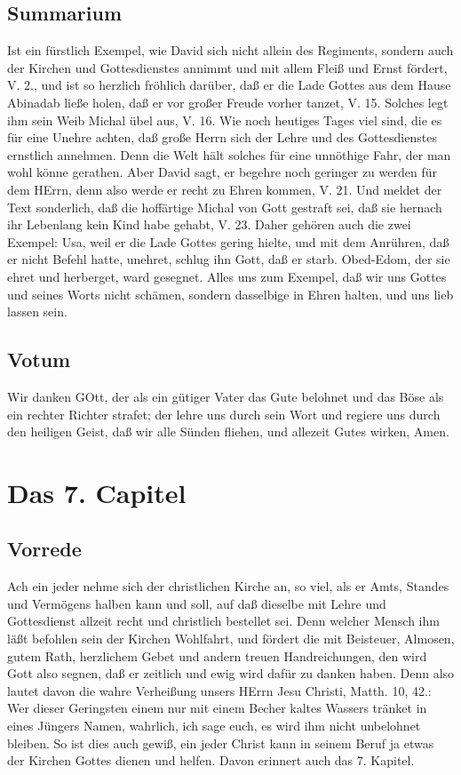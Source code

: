 \section{Summarium}

Ist ein fürstlich Exempel, wie David sich nicht allein des Regiments, sondern auch der Kirchen und Gottesdienstes annimmt und mit allem Fleiß und Ernst fördert, V. 2., und ist so herzlich fröhlich darüber, daß er die Lade Gottes aus dem Hause Abinadab ließe holen, daß er vor großer Freude vorher tanzet, V. 15. Solches legt ihm sein Weib Michal übel aus, V. 16. Wie noch heutiges Tages viel sind, die es für eine Unehre achten, daß große Herrn sich der Lehre und des Gottesdienstes ernstlich annehmen. Denn die Welt hält solches für eine unnöthige Fahr, der man wohl könne gerathen. Aber David sagt, er begehre noch geringer zu werden für dem HErrn, denn also werde er recht zu Ehren kommen, V. 21. Und meldet der Text sonderlich, daß die hoffärtige Michal von Gott gestraft sei, daß sie hernach ihr Lebenlang kein Kind habe gehabt, V. 23. Daher gehören auch die zwei Exempel: Usa, weil er die Lade Gottes gering hielte, und mit dem Anrühren, daß er nicht Befehl hatte, unehret, schlug ihn Gott, daß er starb. Obed-Edom, der sie ehret und herberget, ward gesegnet. Alles uns zum Exempel, daß wir uns Gottes und seines Worts nicht schämen, sondern dasselbige in Ehren halten, und uns lieb lassen sein.

\section{Votum}

Wir danken GOtt, der als ein gütiger Vater das Gute belohnet und das Böse als ein rechter Richter strafet; der lehre uns durch sein Wort und regiere uns durch den heiligen Geist, daß wir alle Sünden fliehen, und allezeit Gutes wirken, Amen.

\chapter{Das 7. Capitel}

\section{Vorrede}

Ach ein jeder nehme sich der christlichen Kirche an, so viel, als er Amts, Standes und Vermögens halben kann und soll, auf daß dieselbe mit Lehre und Gottesdienst allzeit recht und christlich bestellet sei. Denn welcher Mensch ihm läßt befohlen sein der Kirchen Wohlfahrt, und fördert die mit Beisteuer, Almosen, gutem Rath, herzlichem Gebet und andern treuen Handreichungen, den wird Gott also segnen, daß er zeitlich und ewig wird dafür zu danken haben. Denn also lautet davon die wahre Verheißung unsers HErrn Jesu Christi, Matth. 10, 42.: Wer dieser Geringsten einem nur mit einem Becher kaltes Wassers tränket in eines Jüngers Namen, wahrlich, ich sage euch, es wird ihm nicht unbelohnet bleiben. So ist dies auch gewiß, ein jeder Christ kann in seinem Beruf ja etwas der Kirchen Gottes dienen und helfen. Davon erinnert auch das 7. Kapitel.

